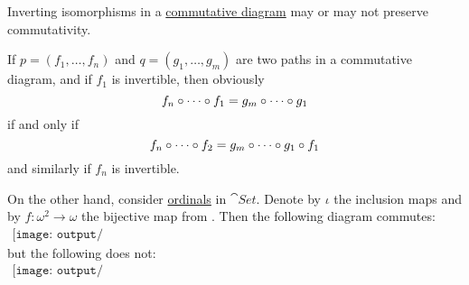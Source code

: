 \begin{remark}\label{rem:inverting_isomorphisms_may_preserve_commutativity}
  Inverting isomorphisms in a \hyperref[def:categorical_diagram]{commutative diagram} may or may not preserve commutativity.

  If \( p = (f_1, \ldots, f_n) \) and \( q = (g_1, \ldots, g_m) \) are two paths in a commutative diagram, and if \( f_1 \) is invertible, then obviously
  \begin{equation*}
    f_n \bincirc \cdots \bincirc f_1 = g_m \bincirc \cdots \bincirc g_1
  \end{equation*}
  if and only if
  \begin{equation*}
    f_n \bincirc \cdots \bincirc f_2 = g_m \bincirc \cdots \bincirc g_1 \bincirc f_1
  \end{equation*}
  and similarly if \( f_n \) is invertible.

  On the other hand, consider \hyperref[def:ordinal]{ordinals} in \( \cat{Set} \). Denote by \( \iota \) the inclusion maps and by \( f: \omega^2 \to \omega \) the bijective map from . Then the following diagram commutes:
  \begin{equation}\label{eq:rem:inverting_isomorphisms_may_preserve_commutativity/ordinals_commuting}
    \begin{aligned}
      \texttt{[image: output/rem\_\_inverting\_isomorphisms\_may\_preserve\_commutativity.pdf]}
    \end{aligned}
  \end{equation}
  but the following does not:
  \begin{equation}\label{eq:rem:inverting_isomorphisms_may_preserve_commutativity/ordinals_not_commuting}
    \begin{aligned}
      \texttt{[image: output/rem\_\_inverting\_isomorphisms\_may\_preserve\_commutativity.pdf]}
    \end{aligned}
  \end{equation}
\end{remark}

